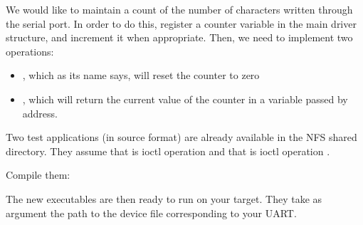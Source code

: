 We would like to maintain a count of the number of characters
written through the serial port. In order to do this, register a counter
variable in the main driver structure, and increment it when
appropriate. Then, we need to implement two 
operations:
\begin{itemize}

 \item {}, which as its name says, will
   reset the counter to zero

 \item {}, which will return the current
   value of the counter in a variable passed by address.

\end{itemize}

Two test applications (in source format) are already available in the
 NFS shared directory.
They assume that  is ioctl operation 
and that  is ioctl operation .

Compile them:


The new executables are then ready to run on your target. They take as
argument the path to the device file corresponding to your UART.
